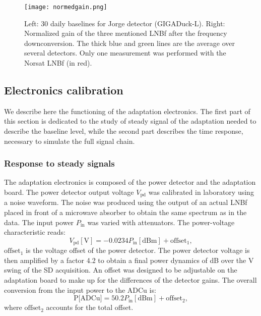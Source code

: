\begin{figure}[!ht]
 \centering
 \hspace*{-3ex}
	 \texttt{[image: normedgain.png]}
 \caption{Left:    30    daily    baselines   for    Jorge    detector
   (GIGADuck-L). Right:  Normalized gain  of the three  mentioned LNBf
   after the frequency downconversion.  The thick blue and green lines
   are the  average over several  detectors. Only one  measurement was
   performed with the Norsat LNBf (in red). }
 \label{fig:GDLbaseline_BW}
\end{figure}


\subsection{Electronics calibration}
\label{sec:elec}
We describe  here the functioning of the  adaptation electronics.  The
first part of this section is  dedicated to the study of steady signal
of the  adaptation needed  to describe the  baseline level,  while the
second  part describes the  time response,  necessary to  simulate the
full signal  chain. 
\subsubsection{Response to steady signals}

\label{sec:calibrationadapt}
The adaptation electronics  is composed of the power  detector and the
adaptation  board. The power  detector output  voltage $V_{\text{pd}}$
was calibrated  in laboratory using  a noise waveform.  The  noise was
produced  using the  output of  an actual  LNBf placed  in front  of a
microwave absorber  to obtain the same  spectrum as in  the data.  The
input  power   $P_{\text{in}}$  was  varied   with  attenuators.   The
power-voltage characteristic reads:
\begin{equation}
  V_{\text{pd}}  [\text{V}]  =  -0.0234 P_{\text{in}}  [\text{dBm}]  +
  \text{offset}_1,
\label{eq:eqpd}
\end{equation}
$\text{offset}_1 $ is  the voltage offset of the  power detector.  The
power detector voltage  is then amplified by a factor  4.2 to obtain a
final power  dynamics of \unit[20]{dB}  over the \unit[2]{V}  swing of
the SD  acquisition.  An offset was  designed to be  adjustable on the
adaptation  board to  make  up  for the  differences  of the  detector
gains. The overall conversion from the input power to the ADCu is:
\begin{equation}
  \text{P[ADCu]} = 50.2 P_{\text{in}} [\text{dBm}] + \text{offset}_2,
\label{eq:eqcalibration}
\end{equation}
where $\text{offset}_2$ accounts for the total offset.

